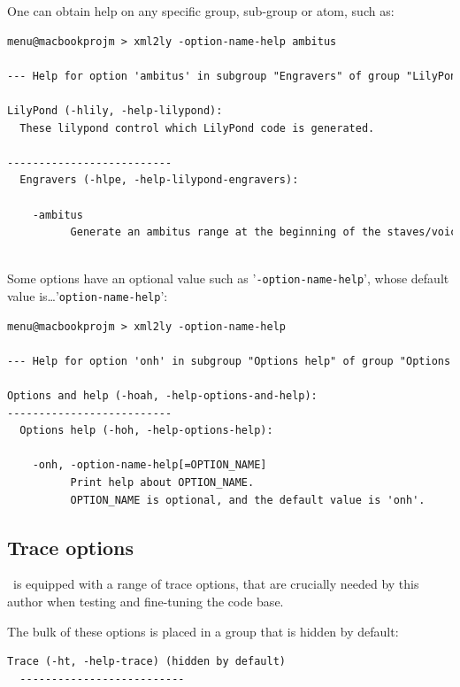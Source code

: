 \documentclass[12pt,a4paper]{article}
\begin{document}
One can obtain help on any specific group, sub-group or atom, such as:
\begin{lstlisting}[language=XML]
menu@macbookprojm > xml2ly -option-name-help ambitus         

--- Help for option 'ambitus' in subgroup "Engravers" of group "LilyPond" ---

LilyPond (-hlily, -help-lilypond):
  These lilypond control which LilyPond code is generated.

--------------------------
  Engravers (-hlpe, -help-lilypond-engravers):
  
    -ambitus
          Generate an ambitus range at the beginning of the staves/voices.
    
\end{lstlisting}

Some options have an optional value such as '{\tt -option-name-help}', whose default value is\dots '{\tt option-name-help}':
\begin{lstlisting}[language=XML]
menu@macbookprojm > xml2ly -option-name-help        

--- Help for option 'onh' in subgroup "Options help" of group "Options and help" ---

Options and help (-hoah, -help-options-and-help):
--------------------------
  Options help (-hoh, -help-options-help):
  
    -onh, -option-name-help[=OPTION_NAME]
          Print help about OPTION_NAME.
          OPTION_NAME is optional, and the default value is 'onh'.
\end{lstlisting}

\subsection{Trace options}

\xmlToLy\ is equipped with a range of trace options, that are crucially needed by this author when testing and fine-tuning the code base.

The bulk of these options is placed in a group that is hidden by default:
\begin{lstlisting}[language=XML]
  Trace (-ht, -help-trace) (hidden by default)
  --------------------------
\end{lstlisting}
\end{document}
